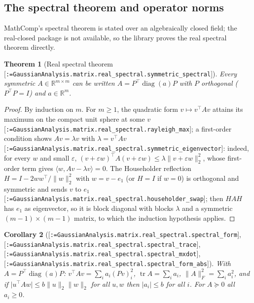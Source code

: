\documentclass[11pt]{article}
\makeatletter
\newcommand{\formal@break}[1]{\@tfor\formal@tok:=#1\do{%
  \formal@tok
  \expandafter\ifx\formal@tok.\allowbreak\else
  \expandafter\ifx\formal@tok\_\allowbreak\fi\fi}}
\DeclareRobustCommand{\formal}[1]{\textnormal{[\texttt{\small\formal@break{#1}}]}}
\newcommand{\R}{\mathbb{R}}
\newcommand{\ip}[2]{\langle #1, #2\rangle}
\newcommand{\norm}[1]{\lVert #1\rVert}
\newcommand{\abs}[1]{\lvert #1\rvert}
\newcommand{\tr}{\operatorname{tr}}
\newcommand{\Fro}{F}
\newcommand{\Id}{I}
\newcommand{\diag}{\operatorname{diag}}
\theoremstyle{plain}
\newtheorem{theorem}{Theorem}[section]
\newtheorem{corollary}[theorem]{Corollary}
\theoremstyle{definition}
\makeatother
\begin{document}
\subsection{The spectral theorem and operator norms}\label{sec:spectral}

MathComp's spectral theorem is stated over an algebraically closed field;
the real-closed package is not available, so the library proves the real
spectral theorem directly.

\begin{theorem}[Real spectral theorem \formal{GaussianAnalysis.matrix.real\_spectral.symmetric\_spectral}]\label{thm:spectral}
Every symmetric $A \in \R^{m\times m}$ can be written $A = P^{\top} \diag(a) P$
with $P$ orthogonal ($P^{\top}P = \Id$) and $a \in \R^m$.
\end{theorem}

\begin{proof}
By induction on $m$. For $m \ge 1$, the quadratic form $v \mapsto v^{\top} A v$
attains its maximum on the compact unit sphere at some $v$
\formal{GaussianAnalysis.matrix.real\_spectral.rayleigh\_max}; a first-order
condition shows $A v = \lambda v$ with $\lambda = v^{\top} A v$
\formal{GaussianAnalysis.matrix.real\_spectral.symmetric\_eigenvector}:
indeed, for every $w$ and small $\varepsilon$, $(v + \varepsilon w)^{\top}A(v + \varepsilon w) \le \lambda \norm{v + \varepsilon w}_2^2$,
whose first-order term gives $\ip{w}{Av - \lambda v} = 0$. The Householder
reflection $H = \Id - 2ww^{\top}/\norm{w}_2^2$ with $w = v - e_1$
(or $H = \Id$ if $w = 0$) is orthogonal and symmetric and sends $v$ to $e_1$
\formal{GaussianAnalysis.matrix.real\_spectral.householder\_swap}; then
$HAH$ has $e_1$ as eigenvector, so it is block diagonal with blocks
$\lambda$ and a symmetric $(m-1)\times(m-1)$ matrix, to which the induction
hypothesis applies.
\end{proof}

\begin{corollary}[\formal{GaussianAnalysis.matrix.real\_spectral.spectral\_form}, \formal{GaussianAnalysis.matrix.real\_spectral.spectral\_trace}, \formal{GaussianAnalysis.matrix.real\_spectral.spectral\_mxdot}, \formal{GaussianAnalysis.matrix.real\_spectral.spectral\_form\_abs}]\label{cor:spectral}
With $A = P^{\top}\diag(a)P$: $v^{\top} A v = \sum_i a_i (Pv)_i^2$,
$\tr A = \sum_i a_i$, $\norm{A}_\Fro^2 = \sum_i a_i^2$, and if
$\abs{u^{\top} A w} \le b\norm{u}_2\norm{w}_2$ for all $u, w$ then
$\abs{a_i} \le b$ for all $i$. For $A \succeq 0$ all $a_i \ge 0$.
\end{corollary}
\end{document}
